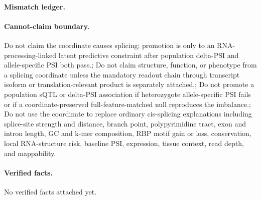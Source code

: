 \paragraph{Mismatch ledger.}
\paragraph{Cannot-claim boundary.} Do not claim the coordinate causes splicing; promotion is only to an RNA-processing-linked latent predictive constraint after population delta-PSI and allele-specific PSI both pass.; Do not claim structure, function, or phenotype from a splicing coordinate unless the mandatory readout chain through transcript isoform or translation-relevant product is separately attached.; Do not promote a population sQTL or delta-PSI association if heterozygote allele-specific PSI fails or if a coordinate-preserved full-feature-matched null reproduces the imbalance.; Do not use the coordinate to replace ordinary cis-splicing explanations including splice-site strength and distance, branch point, polypyrimidine tract, exon and intron length, GC and k-mer composition, RBP motif gain or loss, conservation, local RNA-structure risk, baseline PSI, expression, tissue context, read depth, and mappability.

\paragraph{Verified facts.}
No verified facts attached yet.

